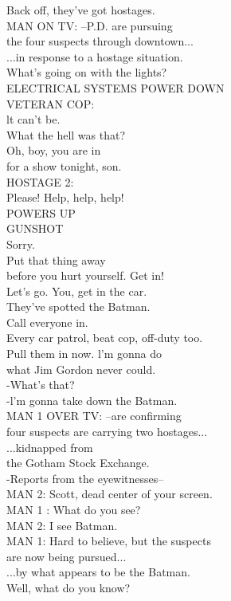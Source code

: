 \documentclass{article}
\begin{document}
\begin{multicols}{3}
Back off, they've got hostages.\\
MAN ON TV: --P.D. are pursuing\\
the four suspects through downtown...\\
...in response to a hostage situation.\\
What's going on with the lights?\\
ELECTRICAL SYSTEMS POWER DOWN\\
VETERAN COP:\\
lt can't be.\\
What the hell was that?\\
Oh, boy, you are in\\
for a show tonight, son.\\
HOSTAGE 2:\\
Please! Help, help, help!\\
POWERS UP\\
GUNSHOT\\
Sorry.\\
Put that thing away\\
before you hurt yourself. Get in!\\
Let's go. You, get in the car.\\
They've spotted the Batman.\\
Call everyone in.\\
Every car patrol, beat cop, off-duty too.\\
Pull them in now. l'm gonna do\\
what Jim Gordon never could.\\
-What's that?\\
-l'm gonna take down the Batman.\\
MAN 1 OVER TV: --are confirming\\
four suspects are carrying two hostages...\\
...kidnapped from\\
the Gotham Stock Exchange.\\
-Reports from the eyewitnesses--\\
MAN 2: Scott, dead center of your screen.\\
MAN 1 : What do you see?\\
MAN 2: I see Batman.\\
MAN 1: Hard to believe, but the suspects\\
are now being pursued...\\
...by what appears to be the Batman.\\
Well, what do you know?\\

\end{multicols}
\end{document}
